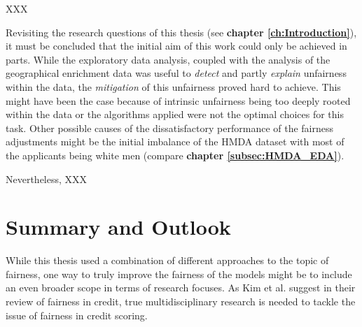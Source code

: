 XXX

Revisiting the research questions of this thesis (see \textbf{chapter \ref{ch:Introduction}}), it must be concluded that the initial aim of this work could only be achieved in parts. 
While the exploratory data analysis, coupled with the analysis of the geographical enrichment data was useful to \textit{detect} and partly \textit{explain} unfairness within the data, the \textit{mitigation} of this unfairness proved hard to achieve. 
This might have been the case because of intrinsic unfairness being too deeply rooted within the data or the algorithms applied were not the optimal choices for this task.
Other possible causes of the dissatisfactory performance of the fairness adjustments might be the initial imbalance of the HMDA dataset with most of the applicants being white men (compare \textbf{chapter \ref{subsec:HMDA_EDA}}).

Nevertheless, XXX

\section{Summary and Outlook}\label{sec:summary}


While this thesis used a combination of different approaches to the topic of fairness, one way to truly improve the fairness of the models might be to include an even broader scope in terms of research focuses.
As Kim et al. \parencite{Kim2023} suggest in their review of fairness in credit, true multidisciplinary research is needed to tackle the issue of fairness in credit scoring.